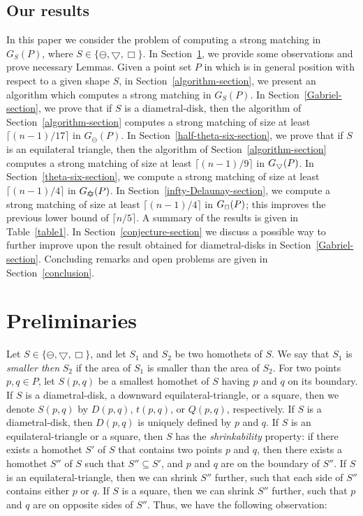 \documentclass[11pt,a4paper]{article}
\newcommand{\G}[2]{G_{#1}({#2})}
\newcommand{\ddisc}{\ominus}
\newcommand{\sqr}{\Box}
\newcommand{\sqrs}{\scriptsize\Box}
\newcommand{\trid}{\bigtriangledown}
\newcommand{\trids}{\scriptsize\bigtriangledown}
\newcommand{\GUD}{G_{\bigtriangledown \hspace*{-7.5pt} \bigtriangleup}}
\begin{document}
\subsection{Our results}
\label{our-results}
In this paper we consider the problem of computing a strong matching in $\G{S}{P}$, where $S\in \{\ddisc,\trid, \sqr\}$. In Section~\ref{preliminaries}, we provide some observations and prove necessary Lemmas. Given a point set $P$ in which is in general position with respect to a given shape $S$, in Section~\ref{algorithm-section}, we present an algorithm which computes a strong matching in $\G{S}{P}$. In Section~\ref{Gabriel-section}, we prove that if $S$ is a diametral-disk, then the algorithm of Section~\ref{algorithm-section} computes a strong matching of size at least $\lceil(n-1)/17\rceil$ in $\G{\ddisc}{P}$. In Section~\ref{half-theta-six-section}, we prove that if $S$ is an equilateral triangle, then the algorithm of Section~\ref{algorithm-section} computes a strong matching of size at least $\lceil(n-1)/9\rceil$ in $\G{\trids}{P}$. In Section~\ref{theta-six-section}, we compute a strong matching of size at least $\lceil (n-1)/4\rceil$ in $\GUD(P)$. In Section~\ref{infty-Delaunay-section}, we compute a strong matching of size at least $\lceil(n-1)/4\rceil$ in $\G{\sqrs}{P}$; this improves the previous lower bound of $\lceil n/5\rceil$. A summary of the results is given in Table~\ref{table1}. In Section~\ref{conjecture-section} we discuss a possible way to further improve upon the result obtained for diametral-disks in Section~\ref{Gabriel-section}. Concluding remarks and open problems are given in Section~\ref{conclusion}.

\section{Preliminaries}
\label{preliminaries}

Let $S\in\{\ddisc, \trid, \sqr\}$, and let $S_1$ and $S_2$ be two homothets of $S$. We say that $S_1$ is {\em smaller then} $S_2$ if the area of $S_1$ is smaller than the area of $S_2$. For two points $p,q\in P$, let $S(p,q)$ be a smallest homothet of $S$ having $p$ and $q$ on its boundary. If $S$ is a diametral-disk, a downward equilateral-triangle, or a square, then we denote $S(p,q)$ by $D(p,q)$, $t(p,q)$, or $Q(p,q)$, respectively. If $S$ is a diametral-disk, then $D(p,q)$ is uniquely defined by $p$ and $q$. If $S$ is an equilateral-triangle or a square, then $S$ has the {\em shrinkability} property: if there exists a homothet $S'$ of $S$ that contains two points $p$ and $q$, then there exists a homothet $S''$ of $S$ such that $S''\subseteq S'$, and $p$ and $q$ are on the boundary of $S''$. If $S$ is an equilateral-triangle, then we can
shrink $S''$ further, such that each side of $S''$ contains either $p$ or $q$. If $S$ is a square, then we can
shrink $S''$ further, such that $p$ and $q$ are on opposite sides of $S''$. Thus, we have the following observation:
\end{document}
